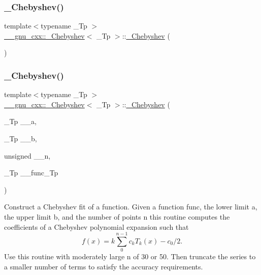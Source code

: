 \subsubsection{\texorpdfstring{\+\_\+\+Chebyshev()}{\_Chebyshev()}\hspace{0.1cm}{\footnotesize\ttfamily [1/6]}}
{\footnotesize\ttfamily template$<$typename \+\_\+\+Tp $>$ \\
\hyperlink{class____gnu__cxx_1_1__Chebyshev}{\+\_\+\+\_\+gnu\+\_\+cxx\+::\+\_\+\+Chebyshev}$<$ \+\_\+\+Tp $>$\+::\hyperlink{class____gnu__cxx_1_1__Chebyshev}{\+\_\+\+Chebyshev} (\begin{DoxyParamCaption}{ }\end{DoxyParamCaption})\hspace{0.3cm}{\ttfamily [inline]}}

\mbox{\label{class____gnu__cxx_1_1__Chebyshev_a7ae17adff595fd004822d7434285ad26}} 
\subsubsection{\texorpdfstring{\+\_\+\+Chebyshev()}{\_Chebyshev()}\hspace{0.1cm}{\footnotesize\ttfamily [2/6]}}
{\footnotesize\ttfamily template$<$typename \+\_\+\+Tp $>$ \\
\hyperlink{class____gnu__cxx_1_1__Chebyshev}{\+\_\+\+\_\+gnu\+\_\+cxx\+::\+\_\+\+Chebyshev}$<$ \+\_\+\+Tp $>$\+::\hyperlink{class____gnu__cxx_1_1__Chebyshev}{\+\_\+\+Chebyshev} (\begin{DoxyParamCaption}\item[{\+\_\+\+Tp}]{\+\_\+\+\_\+a,  }\item[{\+\_\+\+Tp}]{\+\_\+\+\_\+b,  }\item[{unsigned}]{\+\_\+\+\_\+n,  }\item[{\+\_\+\+Tp }]{\+\_\+\+\_\+func\+\_\+\+Tp }\end{DoxyParamCaption})}



Construct a Chebyshev fit of a function. Given a function {\ttfamily func}, the lower limit {\ttfamily a}, the upper limit {\ttfamily b}, and the number of points {\ttfamily n} this routine computes the coefficients of a Chebyshev polynomial expansion such that \[ f(x) = k\sum_{0}^{n-1} c_k T_k(x) - c_0/2. \] Use this routine with moderately large n of 30 or 50. Then truncate the series to a smaller number of terms to satisfy the accuracy requirements. 

